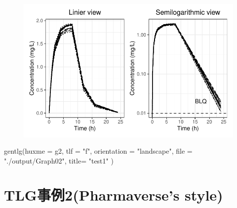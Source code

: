 \documentclass[
  letterpaper,
  DIV=11,
  numbers=noendperiod]{scrreprt}
\newenvironment{Shaded}{\begin{snugshade}}{\end{snugshade}}
\newcommand{\AttributeTok}[1]{\textcolor[rgb]{0.40,0.45,0.13}{#1}}
\newcommand{\FunctionTok}[1]{\textcolor[rgb]{0.28,0.35,0.67}{#1}}
\newcommand{\NormalTok}[1]{\textcolor[rgb]{0.00,0.23,0.31}{#1}}
\newcommand{\StringTok}[1]{\textcolor[rgb]{0.13,0.47,0.30}{#1}}
\begin{document}
\begin{figure}[H]

{\centering \includegraphics{output_flow2_files/figure-pdf/nca3-2.pdf}

}

\end{figure}

\begin{Shaded}
\begin{Highlighting}[]
\FunctionTok{gentlg}\NormalTok{(}\AttributeTok{huxme =}\NormalTok{ g2,}
       \AttributeTok{tlf =} \StringTok{"f"}\NormalTok{,}
       \AttributeTok{orientation =} \StringTok{"landscape"}\NormalTok{,}
       \AttributeTok{file =} \StringTok{"./output/Graph02"}\NormalTok{,}
       \AttributeTok{title=} \StringTok{"test1"}
\NormalTok{)}
\end{Highlighting}
\end{Shaded}


\hypertarget{tlgux4e8bux4f8b2pharmaverses-style-1}{%
\chapter{TLG事例2(Pharmaverse's
style)}\label{tlgux4e8bux4f8b2pharmaverses-style-1}}
\end{document}
